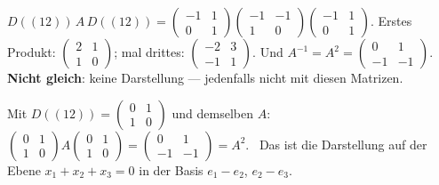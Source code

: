 \begin{aufgabe}
$D((12))\,A\,D((12)) = \begin{pmatrix}-1 & 1\\ 0 & 1\end{pmatrix}\begin{pmatrix}-1 & -1\\ 1 & 0\end{pmatrix}\begin{pmatrix}-1 & 1\\ 0 & 1\end{pmatrix}$. Erstes Produkt: $\begin{pmatrix}2 & 1\\ 1 & 0\end{pmatrix}$; mal drittes: $\begin{pmatrix}-2 & 3\\ -1 & 1\end{pmatrix}$. Und $A^{-1} = A^{2} = \begin{pmatrix}0 & 1\\ -1 & -1\end{pmatrix}$. \textbf{Nicht gleich}: keine Darstellung --- jedenfalls nicht mit diesen Matrizen.

Mit $D((12)) = \begin{pmatrix}0 & 1\\ 1 & 0\end{pmatrix}$ und demselben $A$: $\begin{pmatrix}0 & 1\\ 1 & 0\end{pmatrix}A\begin{pmatrix}0 & 1\\ 1 & 0\end{pmatrix} = \begin{pmatrix}0 & 1\\ -1 & -1\end{pmatrix} = A^{2}$. \checkmark\ Das ist die Darstellung auf der Ebene $x_1 + x_2 + x_3 = 0$ in der Basis $e_1 - e_2$, $e_2 - e_3$.

\begin{center}
\begin{minipage}{0.88\textwidth}
\end{minipage}
\end{center}
\end{aufgabe}

